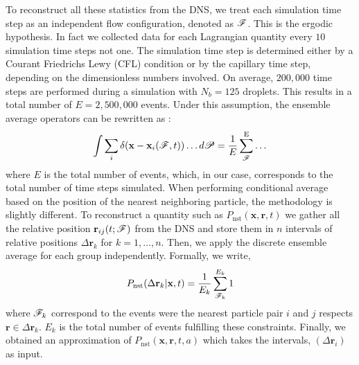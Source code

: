 To reconstruct all these statistics from the DNS, we treat each simulation time step  as an independent flow configuration, denoted as $\mathscr{F}$. 
This is the ergodic hypothesis. 
In fact we collected data for each Lagrangian quantity every $10$ simulation time steps not one. 
The simulation time step is determined either by a Courant Friedrichs Lewy (CFL) condition or by the capillary time step, depending on the dimensionless numbers involved.
On average, $200,000$ time steps are performed during a simulation with $N_b = 125$ droplets. 
This results in a total number of $E = 2,500,000$ events. 
Under this assumption, the ensemble average operators can be rewritten as :
\begin{equation}
    \int \sum_i \delta(\textbf{x}-\textbf{x}_i(\mathscr{F},t)) \ldots d\mathscr{P}
    = \frac{1}{E}\sum_{\mathscr{F}}^\text{E} \ldots 
    \label{eq:discrete_ensemble_average}
\end{equation}
where $E$ is the total number of events, which, in our case, corresponds to the total number of time steps simulated.  
When performing conditional average based on the position of the nearest neighboring particle, the methodology is slightly different. 
To reconstruct a quantity such as $P_\text{nst}(\textbf{x},\textbf{r},t)$ we gather all the relative position $\textbf{r}_{ij}(t;\mathscr{F})$ from the DNS and store them in $n$ intervals of relative positions $\Delta \textbf{r}_k$ for $k = 1,\ldots, n$.
Then, we apply the discrete ensemble average for each group independently.
Formally, we write, 
\begin{equation}
    P_\text{nst}(\Delta\textbf{r}_k|\textbf{x},t)
    = \frac{1}{E_k} 
    \sum^{E_k}_{\mathscr{F}_k} 
    1
    \label{eq:vec_cond}
\end{equation}
where $\mathscr{F}_k$ correspond to the events were the nearest particle pair $i$ and $j$ respects $\textbf{r} \in \Delta \textbf{r}_k$.
$E_k$ is the total number of events fulfilling these constraints. 
Finally, we obtained an approximation of $P_\text{nst}(\textbf{x},\textbf{r},t,a)$ which takes the intervals, $(\Delta\textbf{r}_i)$ as input.

